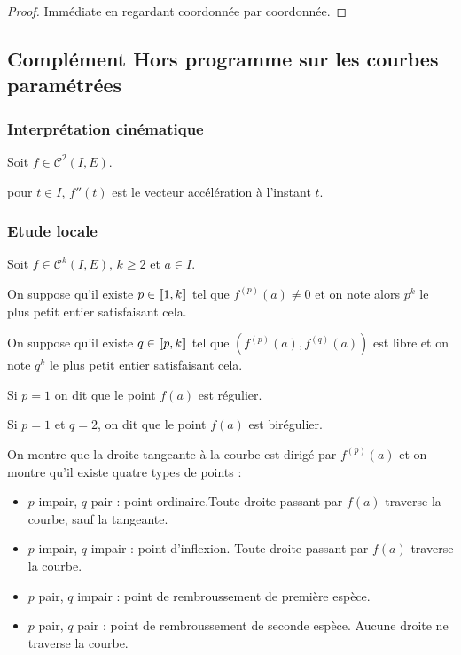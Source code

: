 \begin{proof}
    Immédiate en regardant coordonnée par coordonnée.
\end{proof}

\subsection{Complément Hors programme sur les courbes paramétrées}

\subsubsection{Interprétation cinématique }

Soit $f \in \mathscr C^2(I, E)$. 

pour $t \in I$, $f''(t)$ est le vecteur accélération à l'instant $t$.

\subsubsection{Etude locale }

Soit $f \in \mathscr C^k(I, E), \, k \geqslant 2$ et $a \in I$. 

On suppose qu'il existe $p \in [\![1, k]\!]$ tel que $f^{(p)}(a) \neq 0$ et
on note alors $p^k$ le plus petit entier satisfaisant cela. 

On suppose qu'il existe $q \in [\![p, k]\!]$ tel que $\left( f^{(p)}(a), f^{(q)}(a) \right)$ 
est libre et on note $q^k$ le plus petit entier satisfaisant cela.

Si $p = 1$ on dit que le point $f(a)$ est régulier. 

Si $p = 1$ et $q = 2$, on dit que le point $f(a)$ est birégulier. 

On montre que la droite tangeante à la courbe est dirigé par $f^{(p)}(a)$ et 
on montre qu'il existe quatre types de points : 

\begin{itemize}
    \item $p$ impair, $q$ pair : point ordinaire.Toute droite passant par $f(a)$ traverse la courbe, sauf la tangeante.
    \item $p$ impair, $q$ impair : point d'inflexion. Toute droite passant par $f(a)$ traverse la courbe. 
    \item $p$ pair, $q$ impair : point de rembroussement de première espèce. 
    \item $p$ pair, $q$ pair : point de rembroussement de seconde espèce. Aucune droite ne traverse la courbe.
\end{itemize}

